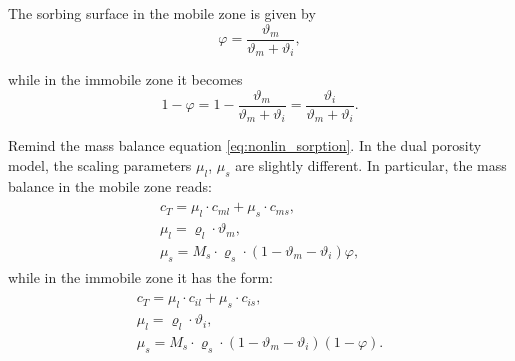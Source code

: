 The sorbing surface in the mobile zone is given by
\begin{equation}
  \varphi = \frac{\vartheta_m}{\vartheta_m + \vartheta_i}, 
\end{equation}

while in the immobile zone it becomes
\[ 1 - \varphi = 1-\frac{\vartheta_m}{\vartheta_m + \vartheta_i} = \frac{\vartheta_i}{\vartheta_m + \vartheta_i}. \]

Remind the mass balance equation \eqref{eq:nonlin_sorption}.
In the dual porosity model, the scaling parameters $\mu_l$, $\mu_s$ are slightly different.
In particular, the mass balance in the mobile zone reads:
\begin{eqnarray}
 \begin{array}{l}
  c_T = \mu_l\cdot c_{ml} + \mu_s\cdot c_{ms},\\
  \mu_l = \varrho_l \cdot \vartheta_m, \\
  \mu_s = M_s \cdot\varrho_s\cdot(1-\vartheta_m - \vartheta_i)\varphi,
 \end{array}
 \label{eq:scale_params_m}
\end{eqnarray}
while in the immobile zone it has the form:
\begin{eqnarray}
 \begin{array}{l}
  c_T = \mu_l\cdot c_{il} + \mu_s\cdot c_{is},\\
  \mu_l = \varrho_l \cdot \vartheta_i, \\
  \mu_s = M_s \cdot\varrho_s\cdot(1-\vartheta_m - \vartheta_i)(1 - \varphi).
 \end{array}
 \label{eq:scale_params_i}
\end{eqnarray}

